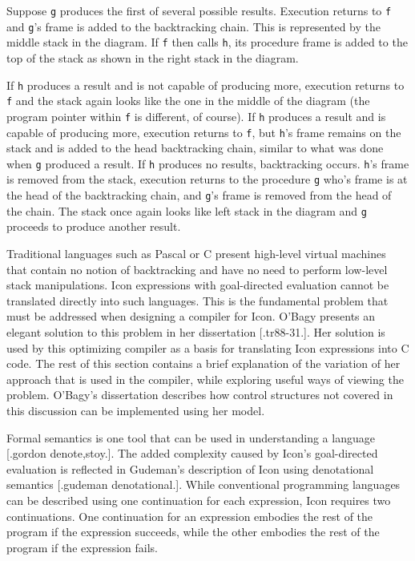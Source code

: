 Suppose \texttt{g} produces the first of several possible
results. Execution returns to \texttt{f} and \texttt{g}'s frame is
added to the backtracking chain. This is represented by the middle
stack in the diagram. If \texttt{f} then calls \texttt{h}, its
procedure frame is added to the top of the stack as shown in the right
stack in the diagram.

If \texttt{h} produces a result and is not capable of producing more,
execution returns to \texttt{f} and the stack again looks like the one
in the middle of the diagram (the program pointer within \texttt{f} is
different, of course). If \texttt{h} produces a result and is capable
of producing more, execution returns to \texttt{f}, but \texttt{h}'s
frame remains on the stack and is added to the head backtracking
chain, similar to what was done when \texttt{g} produced a result.
If \texttt{h} produces no results, backtracking occurs.  \texttt{h}'s
frame is removed from the stack, execution returns to the
procedure \texttt{g} who's frame is at the head of the backtracking
chain, and \texttt{g}'s frame is removed from the head of the
chain. The stack once again looks like left stack in the diagram
and \texttt{g} proceeds to produce another result.


Traditional languages such as Pascal or C present high-level virtual
machines that contain no notion of backtracking and have no need to
perform low-level stack manipulations. Icon expressions with
goal-directed evaluation cannot be translated directly into such
languages. This is the fundamental problem that must be addressed when
designing a compiler for Icon. O'Bagy presents an elegant solution to
this problem in her dissertation [.tr88-31.]. Her solution is used by
this optimizing compiler as a basis for translating Icon expressions
into C code. The rest of this section contains a brief explanation of
the variation of her approach that is used in the compiler, while
exploring useful ways of viewing the problem. O'Bagy's dissertation
describes how control structures not covered in this discussion can be
implemented using her model.

Formal semantics is one tool that can be used in understanding a
language [.gordon denote,stoy.]. The added complexity caused by Icon's
goal-directed evaluation is reflected in Gudeman's description of Icon
using denotational semantics [.gudeman denotational.]. While
conventional programming languages can be described using one
continuation for each expression, Icon requires two continuations. One
continuation for an expression embodies the rest of the program if the
expression succeeds, while the other embodies the rest of the program
if the expression fails.

